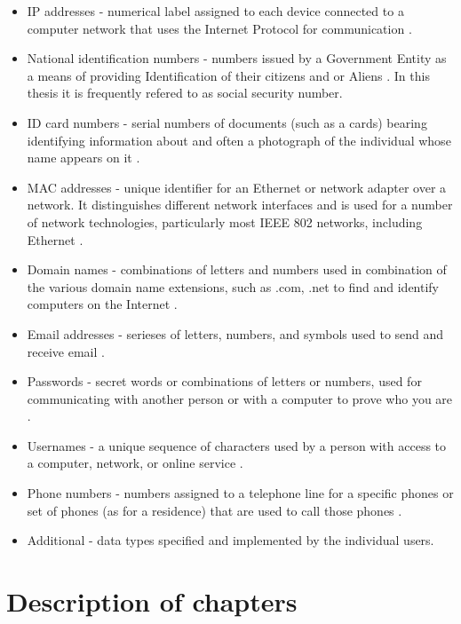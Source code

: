 \documentclass[a4paper,twoside,12pt]{book}
\begin{document}
\begin{itemize}
   \item IP addresses - numerical label assigned to each device connected to a computer network that uses the Internet Protocol for communication \cite{bib:articleIP}.
   \item National identification numbers - numbers issued by a Government Entity as a means of providing Identification of their citizens and or Aliens \cite{bib:internetIdentityNumber}.
   In this thesis it is frequently refered to as social security number.
   \item ID card numbers - serial numbers of documents (such as a cards) bearing identifying information about and often a photograph of the individual whose 
   name appears on it \cite{bib:internetID}. 
   \item MAC addresses - unique identifier for an Ethernet or network adapter over a network. It distinguishes different network interfaces and is used for a number 
   of network technologies, particularly most IEEE 802 networks, including Ethernet \cite{bib:internetMAC}.
   \item Domain names - combinations of letters and numbers used in combination of the various domain name extensions, such as .com, .net to find and 
   identify computers on the Internet \cite{bib:internetDomain}.
   \item Email addresses - serieses of letters, numbers, and symbols used to send and receive email \cite{bib:internetEmail}.
   \item Passwords - secret words or combinations of letters or numbers, used for communicating with another person or with a computer to prove who you are \cite{bib:internetPassword}.
   \item Usernames - a unique sequence of characters used by a person with access to a computer, network, or online service \cite{bib:internetUsername}.
   \item Phone numbers - numbers assigned to a telephone line for a specific phones or set of phones (as for a residence) that are used to call those phones \cite{bib:internetPhone}.
   \item Additional - data types specified and implemented by the individual users.
\end{itemize}


\section{Description of chapters}
\end{document}
